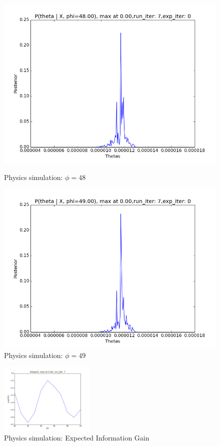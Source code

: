 \documentclass[10pt,journal,compsoc]{IEEEtran}
\begin{document}
\begin{figure}
\begin{minipage}[b]{0.5\linewidth}
\includegraphics[width=1\linewidth]{PhysicsPlots/LP8.png} 
\caption{\label{fig:LP8}Physics simulation: $\phi=48$}
\vspace{1ex}
\end{minipage} 
\begin{minipage}[b]{0.5\linewidth}
\centering
\includegraphics[width=1\linewidth]{PhysicsPlots/LP9.png} 
\caption{\label{fig:LP9}Physics simulation: $\phi=49$}
\vspace{1ex}
\end{minipage} 
\end{figure}


\begin{figure}[ht!]
 \centering
  \includegraphics[width=0.4\textwidth]{PhysicsPlots/EIG_average.png}
  \caption{\label{fig:EIGPhys} Physics simulation: Expected Information Gain}
\end{figure}
\end{document}
